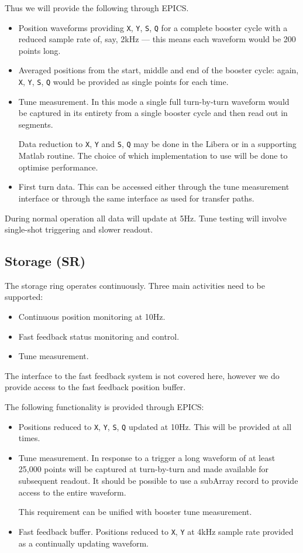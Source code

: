 \documentclass[
    a4paper,
    fleqn
]{article}
\newcommand{\id}[1]{\texttt{#1}}
\newcommand{\XY}{\id{X}, \id{Y}}
\newcommand{\SQ}{\id{S}, \id{Q}}
\newcommand{\XYSQ}{\XY, \SQ}
\begin{document}
Thus we will provide the following through EPICS.
\begin{itemize}
\item
  Position waveforms providing \XYSQ{} for a complete booster cycle
  with a reduced sample rate of, say, 2kHz --- this means each
  waveform would be 200 points long.
\item
  Averaged positions from the start, middle and end of the booster
  cycle: again, \XYSQ{} would be provided as single points for each
  time.
\item
  Tune measurement.  In this mode a single full turn-by-turn waveform
  would be captured in its entirety from a single booster cycle and
  then read out in segments.

  Data reduction to \XY{} and \SQ{} may be done in the Libera or in a
  supporting Matlab routine.  The choice of which implementation to
  use will be done to optimise performance.
\item
  First turn data.  This can be accessed either through the tune
  measurement interface or through the same interface as used for
  transfer paths.
\end{itemize}

During normal operation all data will update at 5Hz.  Tune testing
will involve single-shot triggering and slower readout.


\subsection{Storage (SR)}

The storage ring operates continuously.  Three main activities need to
be supported:
\begin{itemize}
\item
  Continuous position monitoring at 10Hz.
\item
  Fast feedback status monitoring and control.
\item
  Tune measurement.
\end{itemize}
The interface to the fast feedback system is not covered here, however
we do provide access to the fast feedback position buffer.

The following functionality is provided through EPICS:
\begin{itemize}
\item
  Positions reduced to \XYSQ{} updated at 10Hz.  This will be provided
  at all times.
\item
  Tune measurement.  In response to a trigger a long waveform of at
  least 25,000 points will be captured at turn-by-turn and made
  available for subsequent readout.  It should be possible to use a
  subArray record to provide access to the entire waveform.

  This requirement can be unified with booster tune measurement.
\item
  Fast feedback buffer.  Positions reduced to \XY{} at 4kHz sample
  rate provided as a continually updating waveform.
\end{itemize}
\end{document}
